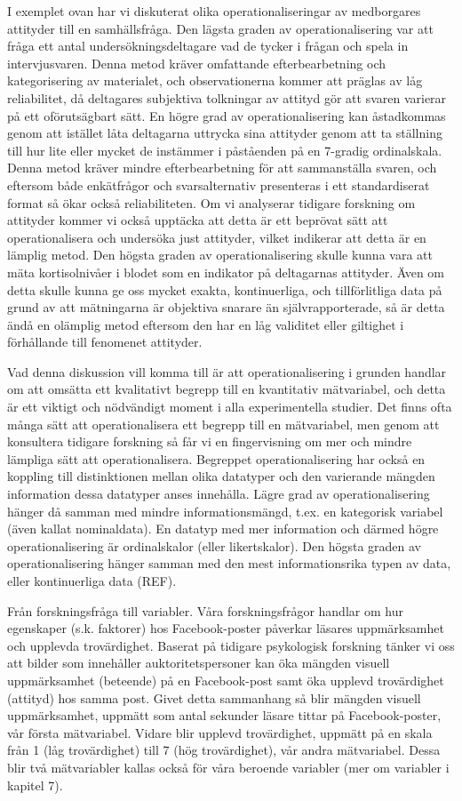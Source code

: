 \documentclass[
]{book}
\begin{document}
I exemplet ovan har vi diskuterat olika operationaliseringar av medborgares attityder till en samhällsfråga. Den lägsta graden av operationalisering var att fråga ett antal undersökningsdeltagare vad de tycker i frågan och spela in intervjusvaren. Denna metod kräver omfattande efterbearbetning och kategorisering av materialet, och observationerna kommer att präglas av låg reliabilitet, då deltagares subjektiva tolkningar av attityd gör att svaren varierar på ett oförutsägbart sätt. En högre grad av operationalisering kan åstadkommas genom att istället låta deltagarna uttrycka sina attityder genom att ta ställning till hur lite eller mycket de instämmer i påståenden på en 7-gradig ordinalskala. Denna metod kräver mindre efterbearbetning för att sammanställa svaren, och eftersom både enkätfrågor och svarsalternativ presenteras i ett standardiserat format så ökar också reliabiliteten. Om vi analyserar tidigare forskning om attityder kommer vi också upptäcka att detta är ett beprövat sätt att operationalisera och undersöka just attityder, vilket indikerar att detta är en lämplig metod. Den högsta graden av operationalisering skulle kunna vara att mäta kortisolnivåer i blodet som en indikator på deltagarnas attityder. Även om detta skulle kunna ge oss mycket exakta, kontinuerliga, och tillförlitliga data på grund av att mätningarna är objektiva snarare än självrapporterade, så är detta ändå en olämplig metod eftersom den har en låg validitet eller giltighet i förhållande till fenomenet attityder.

Vad denna diskussion vill komma till är att operationalisering i grunden handlar om att omsätta ett kvalitativt begrepp till en kvantitativ mätvariabel, och detta är ett viktigt och nödvändigt moment i alla experimentella studier. Det finns ofta många sätt att operationalisera ett begrepp till en mätvariabel, men genom att konsultera tidigare forskning så får vi en fingervisning om mer och mindre lämpliga sätt att operationalisera. Begreppet operationalisering har också en koppling till distinktionen mellan olika datatyper och den varierande mängden information dessa datatyper anses innehålla. Lägre grad av operationalisering hänger då samman med mindre informationsmängd, t.ex. en kategorisk variabel (även kallat nominaldata). En datatyp med mer information och därmed högre operationalisering är ordinalskalor (eller likertskalor). Den högsta graden av operationalisering hänger samman med den mest informationsrika typen av data, eller kontinuerliga data (REF).

Från forskningsfråga till variabler. Våra forskningsfrågor handlar om hur egenskaper (s.k. faktorer) hos Facebook-poster påverkar läsares uppmärksamhet och upplevda trovärdighet. Baserat på tidigare psykologisk forskning tänker vi oss att bilder som innehåller auktoritetspersoner kan öka mängden visuell uppmärksamhet (beteende) på en Facebook-post samt öka upplevd trovärdighet (attityd) hos samma post. Givet detta sammanhang så blir mängden visuell uppmärksamhet, uppmätt som antal sekunder läsare tittar på Facebook-poster, vår första mätvariabel. Vidare blir upplevd trovärdighet, uppmätt på en skala från 1 (låg trovärdighet) till 7 (hög trovärdighet), vår andra mätvariabel. Dessa blir två mätvariabler kallas också för våra beroende variabler (mer om variabler i kapitel 7).
\end{document}
